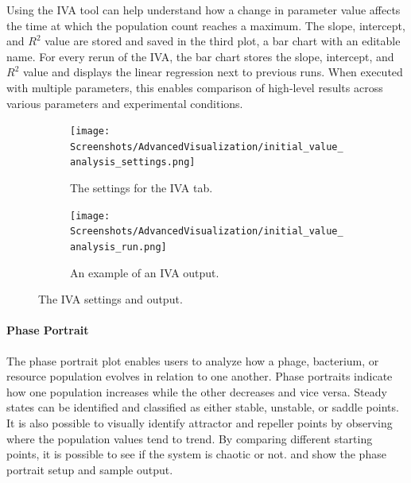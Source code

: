 Using the IVA tool can help understand how a change in parameter value affects the time at which the population count reaches a maximum.
The slope, intercept, and $R^2$ value are stored and saved in the third plot, a bar chart with an editable name. 
For every rerun of the IVA, the bar chart stores the slope, intercept, and $R^2$ value and displays the linear regression next to previous runs. 
When executed with multiple parameters, this enables comparison of high-level results across various parameters and experimental conditions.

\begin{figure}[h!]
    \centering
    \begin{subfigure}{0.49\linewidth}
        \centering
        \captionsetup{width=1\linewidth}
        \texttt{[image: Screenshots/AdvancedVisualization/initial\_value\_analysis\_settings.png]}
        \caption{
            The settings for the IVA tab. 
        }
        \label{fig:ss:av:initial_value_analysis_settings}
        \vspace*{\fill}
    \end{subfigure}
    \hfill
    \begin{subfigure}{0.49\linewidth}
        \centering
        \captionsetup{width=1\linewidth}
        \texttt{[image: Screenshots/AdvancedVisualization/initial\_value\_analysis\_run.png]}
        \caption{
            An example of an IVA output. 
        }
        \label{fig:ss:av:initial_value_analysis_run}
        \vspace*{\fill}
    \end{subfigure}
    \caption{The IVA settings and output. }
\end{figure}

\paragraph{Phase Portrait}
\label{sec:phase_portrait}
The phase portrait plot enables users to analyze how a phage, bacterium, or resource population evolves in relation to one another.
Phase portraits indicate how one population increases while the other decreases and vice versa.
Steady states can be identified and classified as either stable, unstable, or saddle points. 
It is also possible to visually identify attractor and repeller points by observing where the population values tend to trend. 
By comparing different starting points, it is possible to see if the system is chaotic or not.
 and  show the phase portrait setup and sample output. 

